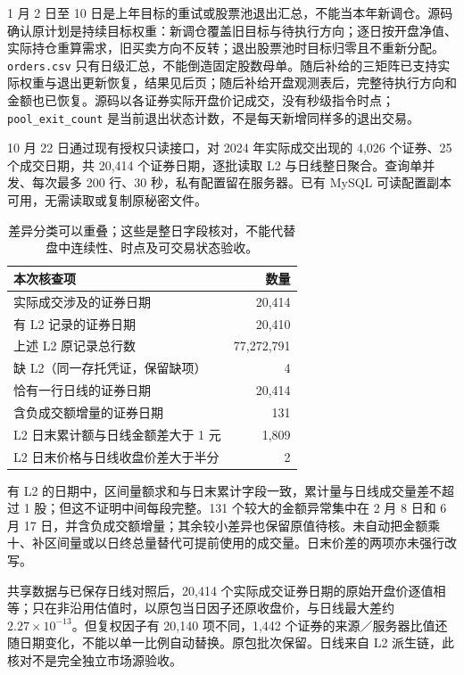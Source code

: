 1 月 2 日至 10 日是上年目标的重试或股票池退出汇总，不能当本年新调仓。源码确认原计划是持续目标权重：新调仓覆盖旧目标与待执行方向；逐日按开盘净值、实际持仓重算需求，旧买卖方向不反转；退出股票池时目标归零且不重新分配。\texttt{orders.csv} 只有日级汇总，不能倒造固定股数母单。随后补给的三矩阵已支持实际权重与退出更新恢复，结果见后页；随后补给开盘观测表后，完整待执行方向和金额也已恢复。源码以各证券实际开盘价记成交，没有秒级指令时点；\texttt{pool\_exit\_count} 是当前退出状态计数，不是每天新增同样多的退出交易。

\clearpage
{}
10 月 22 日通过现有授权只读接口，对 2024 年实际成交出现的 4,026 个证券、25 个成交日期，共 20,414 个证券日期，逐批读取 L2 与日线整日聚合。查询单并发、每次最多 200 行、30 秒，私有配置留在服务器。已有 MySQL 可读配置副本可用，无需读取或复制原秘密文件。

\begin{table}[H]\centering\small
\begin{tabularx}{\linewidth}{Y r}
\toprule 本次核查项 & 数量\\\midrule
实际成交涉及的证券日期 & 20,414\\
有 L2 记录的证券日期 & 20,410\\
上述 L2 原记录总行数 & 77,272,791\\
缺 L2（同一存托凭证，保留缺项） & 4\\
恰有一行日线的证券日期 & 20,414\\
含负成交额增量的证券日期 & 131\\
L2 日末累计额与日线金额差大于 1 元 & 1,809\\
L2 日末价格与日线收盘价差大于半分 & 2\\
\bottomrule
\end{tabularx}
\caption{差异分类可以重叠；这些是整日字段核对，不能代替盘中连续性、时点及可交易状态验收。}
\end{table}


有 L2 的日期中，区间量额求和与日末累计字段一致，累计量与日线成交量差不超过 1 股；但这不证明中间每段完整。131 个较大的金额异常集中在 2 月 8 日和 6 月 17 日，并含负成交额增量；其余较小差异也保留原值待核。未自动把金额乘十、补区间量或以日终总量替代可提前使用的成交量。日末价差的两项亦未强行改写。

共享数据与已保存日线对照后，20,414 个实际成交证券日期的原始开盘价逐值相等；只在非沿用估值时，以原包当日因子还原收盘价，与日线最大差约 $2.27\times10^{-13}$。但复权因子有 20,140 项不同，1,442 个证券的来源／服务器比值还随日期变化，不能以单一比例自动替换。原包批次保留。日线来自 L2 派生链，此核对不是完全独立市场源验收。

